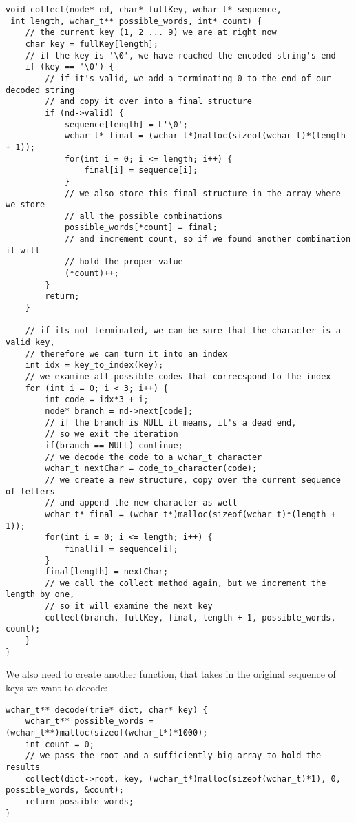 \documentclass[a4paper,11pt]{article}
\begin{document}
     \begin{verbatim}
void collect(node* nd, char* fullKey, wchar_t* sequence,
 int length, wchar_t** possible_words, int* count) {
    // the current key (1, 2 ... 9) we are at right now
    char key = fullKey[length];
    // if the key is '\0', we have reached the encoded string's end
    if (key == '\0') {
        // if it's valid, we add a terminating 0 to the end of our decoded string 
        // and copy it over into a final structure
        if (nd->valid) {
            sequence[length] = L'\0';
            wchar_t* final = (wchar_t*)malloc(sizeof(wchar_t)*(length + 1));
            for(int i = 0; i <= length; i++) {
                final[i] = sequence[i];
            }
            // we also store this final structure in the array where we store 
            // all the possible combinations
            possible_words[*count] = final;
            // and increment count, so if we found another combination it will
            // hold the proper value
            (*count)++;
        }
        return;
    }   

    // if its not terminated, we can be sure that the character is a valid key,
    // therefore we can turn it into an index
    int idx = key_to_index(key);
    // we examine all possible codes that correcspond to the index
    for (int i = 0; i < 3; i++) {
        int code = idx*3 + i;
        node* branch = nd->next[code];
        // if the branch is NULL it means, it's a dead end,
        // so we exit the iteration
        if(branch == NULL) continue;
        // we decode the code to a wchar_t character
        wchar_t nextChar = code_to_character(code);
        // we create a new structure, copy over the current sequence of letters
        // and append the new character as well
        wchar_t* final = (wchar_t*)malloc(sizeof(wchar_t)*(length + 1));
        for(int i = 0; i <= length; i++) {
            final[i] = sequence[i];
        }
        final[length] = nextChar;
        // we call the collect method again, but we increment the length by one,
        // so it will examine the next key
        collect(branch, fullKey, final, length + 1, possible_words, count);
    }
} 
     \end{verbatim}

     We also need to create another function, that takes in the original sequence of keys we want to decode:

     \begin{verbatim}
wchar_t** decode(trie* dict, char* key) {
    wchar_t** possible_words = (wchar_t**)malloc(sizeof(wchar_t*)*1000);
    int count = 0;
    // we pass the root and a sufficiently big array to hold the results
    collect(dict->root, key, (wchar_t*)malloc(sizeof(wchar_t)*1), 0, possible_words, &count);
    return possible_words;
}
     \end{verbatim}
\end{document}
